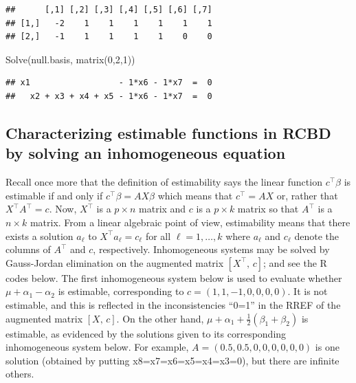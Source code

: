 \documentclass[
]{book}
\newenvironment{Shaded}{\begin{snugshade}}{\end{snugshade}}
\newcommand{\DecValTok}[1]{\textcolor[rgb]{0.00,0.00,0.81}{#1}}
\newcommand{\FunctionTok}[1]{\textcolor[rgb]{0.00,0.00,0.00}{#1}}
\newcommand{\NormalTok}[1]{#1}
\begin{document}
\begin{verbatim}
##      [,1] [,2] [,3] [,4] [,5] [,6] [,7]
## [1,]   -2    1    1    1    1    1    1
## [2,]   -1    1    1    1    1    0    0
\end{verbatim}

\begin{Shaded}
\begin{Highlighting}[]
\FunctionTok{Solve}\NormalTok{(null.basis, }\FunctionTok{matrix}\NormalTok{(}\DecValTok{0}\NormalTok{,}\DecValTok{2}\NormalTok{,}\DecValTok{1}\NormalTok{))}
\end{Highlighting}
\end{Shaded}

\begin{verbatim}
## x1                  - 1*x6 - 1*x7  =  0 
##   x2 + x3 + x4 + x5 - 1*x6 - 1*x7  =  0
\end{verbatim}

\hypertarget{characterizing-estimable-functions-in-rcbd-by-solving-an-inhomogeneous-equation}{%
\subsection{Characterizing estimable functions in RCBD by solving an inhomogeneous equation}\label{characterizing-estimable-functions-in-rcbd-by-solving-an-inhomogeneous-equation}}

Recall once more that the definition of estimability says the linear function \(c^\top \beta\) is estimable if and only if \(c^\top \beta = AX\beta\) which means that \(c^\top = AX\) or, rather that \(X^\top A^\top = c\). Now, \(X^\top\) is a \(p\times n\) matrix and \(c\) is a \(p \times k\) matrix so that \(A^\top\) is a \(n\times k\) matrix. From a linear algebraic point of view, estimability means that there exists a solution \(a_\ell\) to \(X^\top a_\ell = c_\ell\) for all \(\ell = 1, \ldots, k\) where \(a_\ell\) and \(c_\ell\) denote the columns of \(A^\top\) and \(c\), respectively. Inhomogeneous systems may be solved by Gauss-Jordan elimination on the augmented matrix \([X^\top ,\,c]\); and see the R codes below.
The first inhomogeneous system below is used to evaluate whether \(\mu + \alpha_1 - \alpha_2\) is estimable, corresponding to \(c = (1,1,-1,0,0,0,0)\). It is not estimable, and this is reflected in the inconsistencies ``0=1'' in the RREF of the augmented matrix \([X, \, c]\). On the other hand, \(\mu + \alpha_1 + \tfrac12(\beta_1 + \beta_2)\) is estimable, as evidenced by the solutions given to its corresponding inhomogeneous system below. For example, \(A = (0.5,0.5,0,0,0,0,0,0)\) is one solution (obtained by putting x8=x7=x6=x5=x4=x3=0), but there are infinite others.
\end{document}
